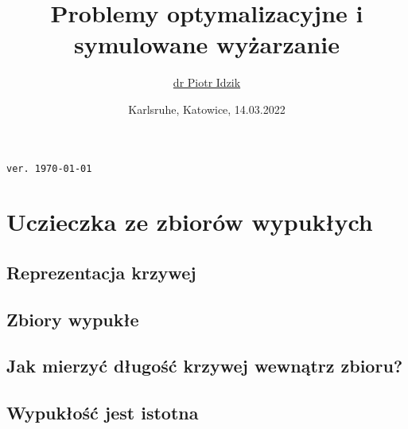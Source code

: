 \documentclass[aspectratio=169]{beamer}
\author{\texorpdfstring{\href{\myLinkedinLink}{dr Piotr Idzik} \\ \email{\myEmail}}{Piotr Idzik}}
\title{Problemy optymalizacyjne i symulowane wyżarzanie}
\date{Karlsruhe, Katowice, 14.03.2022}
\newcommand{\myLinkedinLink}{https://www.linkedin.com/in/piotr-idzik-34b572151/}
\newcommand{\myGithubLink}{https://github.com/vil02/}
\newcommand{\myLinkedin}{\href{\myLinkedinLink}{\faLinkedinSquare}}
\newcommand{\myGithub}{\href{\myGithubLink}{\faGithubSquare}}
\begin{document}
\begin{frame}[plain]
\maketitle

\myLinkedin{}
\myGithub{}
\hfill \textcolor[rgb]{0.85,0.85,0.85}{\texttt{\tiny{ver. \today\ \currenttime\/}}}
\end{frame}

\section{Uczieczka ze zbiorów wypukłych}
\subsection{Reprezentacja krzywej}
{\curveRepresentationExampleTex}
\subsection{Zbiory wypukłe}
{\convexExamplesTex}
\subsection{Jak mierzyć długość krzywej wewnątrz zbioru?}
{\lengthInsideExampleTex}
\subsection{Wypukłość jest istotna}
{\lengthInsideExampleNonconvexTex}
\end{document}
